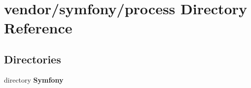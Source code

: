 \section{vendor/symfony/process Directory Reference}
\label{dir_55ee1be048a1437ef2fc49ffab8fb292}
\subsection*{Directories}
\begin{DoxyCompactItemize}
\item 
directory {\bf Symfony}
\end{DoxyCompactItemize}
